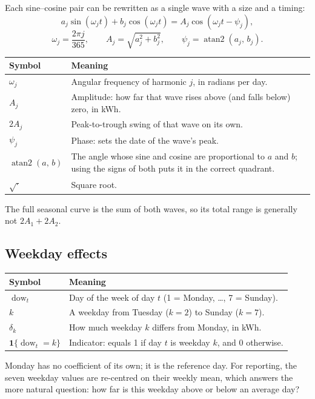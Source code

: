 \documentclass[11pt]{article}
\makeatletter
\DeclareMathOperator{\dow}{dow}
\DeclareMathOperator{\atantwo}{atan2}
\newenvironment{reftable}[3]
  {\par\nopagebreak\addvspace{4pt}\noindent
   \renewcommand{\arraystretch}{1.3}%
   \begin{tabular}{@{}>{\raggedright\arraybackslash}p{#1\textwidth}
                      >{\raggedright\arraybackslash}p{\dimexpr0.97\textwidth-#1\textwidth-2\tabcolsep\relax}@{}}
   \toprule \textbf{#2} & \textbf{#3} \\ \midrule}
  {\bottomrule\end{tabular}\par\addvspace{8pt}}
\makeatother
\begin{document}
Each sine--cosine pair can be rewritten as a single wave with a size and a
timing:
\begin{equation}
a_j\sin(\omega_j t) + b_j\cos(\omega_j t) = A_j\cos(\omega_j t - \psi_j),
\label{eq:amp}
\end{equation}
\begin{equation}
\omega_j = \frac{2\pi j}{365}, \qquad
A_j = \sqrt{a_j^2 + b_j^2}, \qquad
\psi_j = \atantwo(a_j,\, b_j).
\label{eq:phase}
\end{equation}

\begin{reftable}{0.2}{Symbol}{Meaning}
$\omega_j$ & Angular frequency of harmonic $j$, in radians per day. \\
$A_j$ & Amplitude: how far that wave rises above (and falls below) zero, in kWh. \\
$2A_j$ & Peak-to-trough swing of that wave on its own. \\
$\psi_j$ & Phase: sets the date of the wave's peak. \\
$\atantwo(a,\, b)$ & The angle whose sine and cosine are proportional to $a$ and $b$; using the signs of both puts it in the correct quadrant. \\
$\sqrt{\cdot}$ & Square root. \\
\end{reftable}

The full seasonal curve is the sum of both waves, so its total range is
generally not $2A_1 + 2A_2$.

\subsection{Weekday effects}

\begin{reftable}{0.2}{Symbol}{Meaning}
$\dow_t$ & Day of the week of day $t$ (1 = Monday, \ldots, 7 = Sunday). \\
$k$ & A weekday from Tuesday ($k = 2$) to Sunday ($k = 7$). \\
$\delta_k$ & How much weekday $k$ differs from Monday, in kWh. \\
$\mathbf{1}\{\dow_t = k\}$ & Indicator: equals 1 if day $t$ is weekday $k$, and 0 otherwise. \\
\end{reftable}

Monday has no coefficient of its own; it is the reference day. For reporting,
the seven weekday values are re-centred on their weekly mean, which answers the
more natural question: how far is this weekday above or below an average day?
\end{document}
